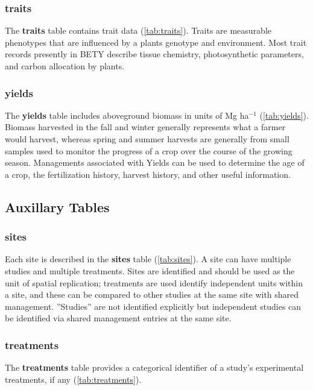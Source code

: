 \documentclass[10pt]{article}
\begin{document}
\subsubsection{traits}

 The \textbf{traits} table contains trait data (\autoref{tab:traits}).
 Traits are measurable phenotypes that are influenced by a plants genotype and environment. 
 Most trait records presently in BETY describe tissue chemistry, photosynthetic parameters, and carbon allocation by plants.


\subsubsection{yields}
 
 The \textbf{yields} table includes aboveground biomass in units of Mg ha$^{-1}$  (\autoref{tab:yields}).
 Biomass harvested in the fall and winter generally represents what a farmer would harvest, whereas spring and summer harvests are generally from small samples used to monitor the progress of a crop over the course of the growing season.
 Managements associated with Yields can be used to determine the age of a crop, the fertilization history, harvest history, and other useful information.

\subsection{Auxillary Tables}

\subsubsection{sites}
 Each site is described in the \textbf{sites} table (\autoref{tab:sites}). 
 A site can have multiple studies and multiple treatments. Sites are identified and should be used as the unit of spatial replication; treatments are used identify independent units within a site, and these can be compared to other studies at the same site with shared management. 
 ''Studies'' are not identified explicitly but independent studies can be identified via shared management entries at the same site.  

\subsubsection{treatments}

The \textbf{treatments} table  provides a categorical identifier of a study's experimental treatments, if any (\autoref{tab:treatments}).
\end{document}
